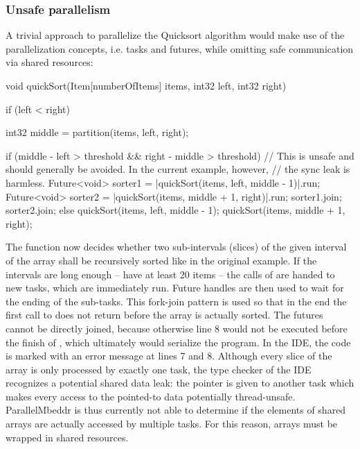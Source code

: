 \subsubsection{Unsafe parallelism}
A trivial approach to parallelize the Quicksort algorithm would make use of the parallelization concepts, i.e. tasks and futures, while omitting safe communication via shared resources:
\begin{ccode}
void quickSort(Item[numberOfItems] items, int32 left, int32 right) { 
  if (left < right) { 
    int32 middle = partition(items, left, right); 
     
    if (middle - left > threshold && right - middle > threshold) { 
      // This is unsafe and should generally be avoided. In the current example, however, 
      // the sync leak is harmless. 
      Future<void> sorter1 = |quickSort(items, left, middle - 1)|.run; 
      Future<void> sorter2 = |quickSort(items, middle + 1, right)|.run; 
      sorter1.join; 
      sorter2.join; 
    } else { 
      quickSort(items, left, middle - 1); 
      quickSort(items, middle + 1, right); 
    }
  } 
}
\end{ccode}
The function now decides whether two sub-intervals (slices) of the given interval of the array shall be recursively sorted like in the original example. If the intervals are long enough -- have at least 20 items -- the calls of  are handed to new tasks, which are immediately run. Future handles are then used to wait for the ending of the sub-tasks. This fork-join pattern is used so that in the end the first call to  does not return before the array is actually sorted. The futures cannot be directly joined, because otherwise line 8 would not be executed before the finish of , which ultimately would serialize the program. In the IDE, the code is marked with an error message at lines 7 and 8. Although every slice of the array is only processed by exactly one task, the type checker of the IDE recognizes a potential shared data leak: the pointer  is given to another task which makes every access to the pointed-to data potentially thread-unsafe. ParallelMbeddr is thus currently not able to determine if the elements of shared arrays are actually accessed by multiple tasks. For this reason, arrays must be wrapped in shared resources.

